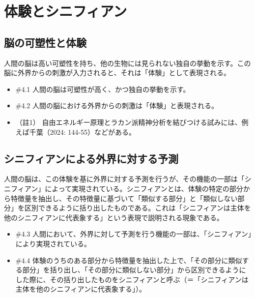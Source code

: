 \section{体験とシニフィアン}\label{ux4f53ux9a13ux3068ux30b7ux30cbux30d5ux30a3ux30a2ux30f3}

\subsection{脳の可塑性と体験}\label{ux8133ux306eux53efux5851ux6027ux3068ux4f53ux9a13}

人間の脳は高い可塑性を持ち、他の生物には見られない独自の挙動を示す。この脳に外界からの刺激が入力されると、それは「体験」として表現される。

\begin{note}{}
  \begin{itemize}
    \tightlist
    \item{\#4.1}
      人間の脳は可塑性が高く、かつ独自の挙動を示す。
    \item{\#4.2}
      人間の脳における外界からの刺激は「体験」と表現される。
  \end{itemize}
\end{note}

\begin{itemize}
\tightlist
\item
  （註1）
  \mbox{自由エネルギー原理}とラカン派精神分析を結びつける試みには、例えば千葉（2024:
  144-55）\cite{Chiba}などがある。
\end{itemize}

\subsection{シニフィアンによる外界に対する予測}\label{ux30b7ux30cbux30d5ux30a3ux30a2ux30f3ux306bux3088ux308bux5916ux754cux306bux5bfeux3059ux308bux4e88ux6e2c}

人間の脳は、この体験を基に外界に対する予測を行うが、その機能の一部は「シニフィアン」によって実現されている。シニフィアンとは、体験の特定の部分から特徴量を抽出し、その特徴量に基づいて「類似する部分」と「類似しない部分」を区別できるように括り出したものである。これは「シニフィアンは主体を他のシニフィアンに代表象する」という表現で説明される現象である。

\begin{note}{}
  \begin{itemize}
    \tightlist
    \item{\#4.3}
      人間において、外界に対して予測を行う機能の一部は、「シニフィアン」により実現されている。
    \item{\#4.4}
      体験のうちのある部分から特徴量を抽出した上で、「その部分に類似する部分」を括り出し、「その部分に類似しない部分」から区別できるようにした際に、その括り出したものをシニフィアンと呼ぶ（＝「シニフィアンは主体を他のシニフィアンに代表象する」）。
  \end{itemize}
\end{note}

